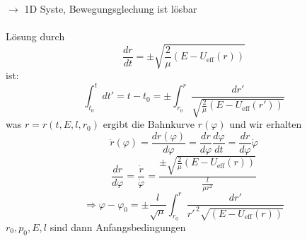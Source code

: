 \documentclass[titlepage,12pt,a4paper,ngerman]{report}
\newcommand{\tx}[1]{\textrm{#1}}
\newcommand{\intt}[2]{\int_{#1}^{#2}}
\begin{document}
$\rightarrow$ 1D Syste, Bewegungsglechung ist lösbar\\\\
Lösung durch
$$\frac{dr}{dt} = \pm \sqrt{\frac{2}{\mu} (E-U_{\tx{eff}} (r))}$$
ist:
$$\intt{t_0}{t} dt' = t-t_0 = \pm \intt{r_0}{r} \frac{dr'}{\sqrt{\frac{2}{\mu} (E - U_{\tx{eff}} (r'))}}$$
was $r = r(t,E,l,r_0)$ ergibt die Bahnkurve $r(\varphi)$ und wir erhalten
$$\dot{r}(\varphi) = \frac{dr(\varphi)}{d\varphi} = \frac{dr}{d\varphi} \frac{d\varphi}{dt} = \frac{dr}{d\varphi} \dot{\varphi}$$
$$\frac{dr}{d\varphi} = \frac{\dot{r}}{\dot{\varphi}} =  \frac{\pm \sqrt{\frac{2}{\mu} (E - U_{\tx{eff}} (r))}}{\frac{l}{\mu r^2}} $$
$$ \Rightarrow \varphi - \varphi_0 = \pm \frac{l}{\sqrt{\mu}} \int_{r_0}^{r} \frac{dr'}{r'^{\,2} \sqrt{(E - U_{\tx{eff}} (r))}}$$
$ r_0, p_0, E, l $ sind dann Anfangsbedingungen


\end{document}
